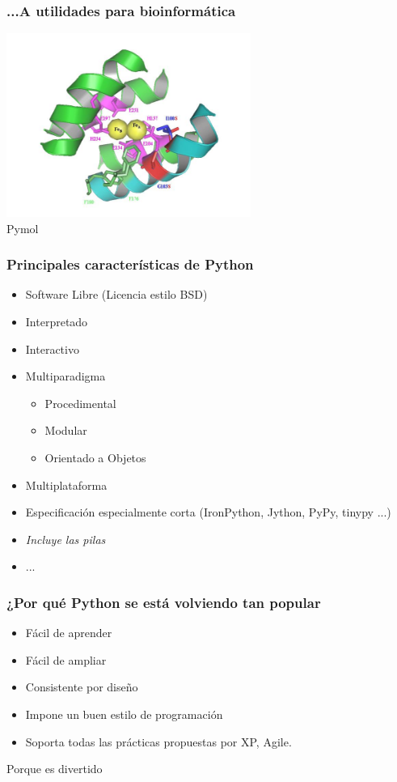 \documentclass{beamer}
\begin{document}
\begin{frame}
 \frametitle{...A utilidades para bioinformática}
\begin{center}
 \includegraphics[width=8cm]{files/pymol.jpg}\\
Pymol
\end{center}

\end{frame}

\begin{frame}
 \frametitle{Principales características de Python}

\begin{itemize}
 \item Software Libre (Licencia estilo BSD)
 \item Interpretado
 \item Interactivo
 \item Multiparadigma
 \begin{itemize}
  \item Procedimental
  \item Modular
  \item Orientado a Objetos
 \end{itemize}
 \item Multiplataforma
 \item Especificación especialmente corta (IronPython, Jython, PyPy,
   tinypy ...)
 \item \emph{Incluye las pilas}
 \item ...
\end{itemize}

\end{frame}

\begin{frame}
 \frametitle{¿Por qué Python se está volviendo tan popular}
\begin{itemize}
 \item Fácil de aprender
 \item Fácil de ampliar
 \item Consistente por diseño
 \item Impone un buen estilo de programación
 \item Soporta todas las prácticas propuestas por XP, Agile.
\end{itemize}
\begin{center}
 Porque es divertido
\end{center}
\end{frame}
\end{document}
